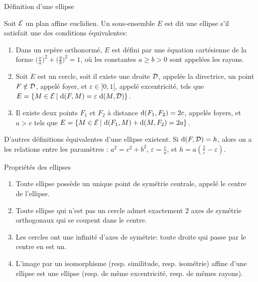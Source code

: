 \documentclass[11pt]{m53beamer}
\begin{document}
\begin{frame}{Définition d'une ellipse}
  \begin{defprop}
    Soit $\mathcal{E}$ un plan affine euclidien. Un sous-ensemble $E$ est dit une \alert{ellipse} s'il satisfait une des conditions équivalentes:
    \begin{enumerate}[<+(1)->]
      \item Dans un repère orthonormé, $E$ est défini par une équation cartésienne de la forme $\big(\frac{x}{a}\big)^{2}+\big(\frac{y}{b}\big)^{2}=1$, où les constantes $a \geq b > 0$ sont appelées \alert{les rayons}.
      \item Soit $E$ est un cercle, soit il existe une droite $\mathcal{D}$, appelée \alert{la directrice}, un point $F \notin \mathcal{D}$, appelé \alert{foyer}, et $\varepsilon \in ]0,1[$, appelé \alert{excentricité}, tels que $E = \{ M \in \mathcal{E} \,|\, \operatorname{d}(F,M)=\varepsilon\,\operatorname{d}(M,\mathcal{D})\}$.
      \item Il existe deux points $F_{1}$ et $F_{2}$ à distance $\operatorname{d}(F_{1},F_{2})=2c$, appelés \alert{foyers},  et $a > c$ tels que $E = \{ M \in \mathcal{E} \,|\, \operatorname{d}(F_{1},M)+\operatorname{d}(M,F_{2})=2a\}$.
    \end{enumerate}
  \end{defprop}\pause
  D'autres définitions équivalentes d'une ellipse existent.\pause{}\newline
  Si $\operatorname{d}(F,\mathcal{D})=h$, alors on a les relations entre les paramètres : $a^{2}=c^{2}+b^{2}$, $\varepsilon =\frac{c}{a}$, et $h=a(\frac{1}{\varepsilon}-\varepsilon)$.
\end{frame}
\begin{frame}{Propriétés des ellipses}
  \begin{enumerate}[<+(1)->]
    \item Toute ellipse possède un unique point de symétrie centrale, appelé \alert{le centre} de l'ellipse.
    \item Toute ellipse qui n'est pas un cercle admet exactement $2$ axes de symétrie orthogonaux qui se coupent dans le centre.
    \item Les cercles ont une infinité d'axes de symétrie: toute droite qui passe par le centre en est un.
    \item L'image par un isomorphisme (resp. similitude, resp. isométrie) affine d'une ellipse est une ellipse (resp. de même excentricité, resp. de mêmes rayons).
  \end{enumerate}
\end{frame}
\end{document}
